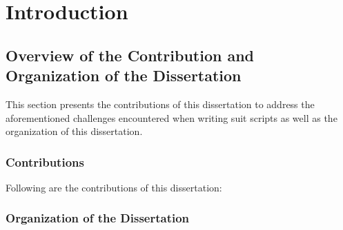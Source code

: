 \chapter{Introduction}
\label{chap:introduction}

\chapterPage{
}


\section{Overview of the Contribution and Organization of the Dissertation}

This section presents the contributions of this dissertation to address the aforementioned challenges encountered when writing \gls{suit} scripts as well as the organization of this dissertation. 

\subsection{Contributions}

Following are the contributions of this dissertation:


\subsection{Organization of the Dissertation}
